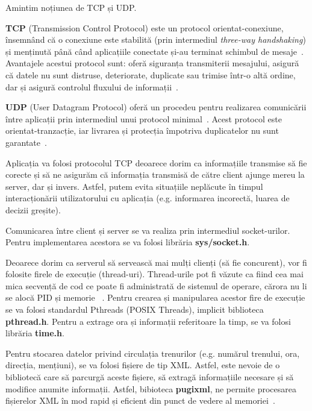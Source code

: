 \documentclass[runningheads]{llncs}
\begin{document}
Amintim noțiunea de TCP și UDP.

\textbf{TCP} (Transmission Control Protocol) este un protocol orientat-conexiune, însemnând că o conexiune este stabilită (prin intermediul \textit{three-way handshaking}) și menținută până când aplicațiile conectate și-au terminat schimbul de mesaje~\cite{ref_url1}. Avantajele acestui protocol sunt: oferă siguranța transmiterii mesajului, asigură că datele nu sunt distruse, deteriorate, duplicate sau trimise într-o altă ordine, dar și asigură controlul fluxului de informații~\cite{ref_url2}.

\textbf{UDP} (User Datagram Protocol) oferă un procedeu pentru realizarea comunicării între aplicații prin intermediul unui protocol minimal~\cite{ref_url3}. Acest protocol este orientat-tranzacție, iar livrarea și protecția împotriva duplicatelor nu sunt garantate~\cite{ref_url3}.

Aplicația va folosi protocolul TCP deoarece dorim ca informațiile transmise să fie corecte și să ne asigurăm că informația transmisă de către client ajunge mereu la server, dar și invers. Astfel, putem evita situațiile neplăcute în timpul interacționării utilizatorului cu aplicația (e.g. informarea incorectă, luarea de decizii greșite).

Comunicarea între client și server se va realiza prin intermediul socket-urilor. Pentru implementarea acestora se va folosi librăria \textbf{sys/socket.h}.

Deoarece dorim ca serverul să servească mai mulți clienți (să fie concurent), vor fi folosite firele de execuție (thread-uri). Thread-urile pot fi văzute ca fiind cea mai mica secvență de cod ce poate fi administrată de sistemul de operare, cărora nu li se alocă PID și memorie ~\cite{ref_url4}. Pentru crearea și manipularea acestor fire de execuție se va folosi standardul Pthreads (POSIX Threads), implicit biblioteca \textbf{pthread.h}. Pentru a extrage ora și informații referitoare la timp, se va folosi librăria \textbf{time.h}.

Pentru stocarea datelor privind circulația trenurilor (e.g. numărul trenului, ora, direcția, mențiuni), se va folosi fișiere de tip XML. Astfel, este nevoie de o bibliotecă care să parcurgă aceste fișiere, să extragă informațiile necesare și să modifice anumite informații. Astfel, bibioteca \textbf{pugixml}, ne permite procesarea fișierelor XML în mod rapid și eficient din punct de vedere al memoriei~\cite{ref_url5}.
\end{document}
